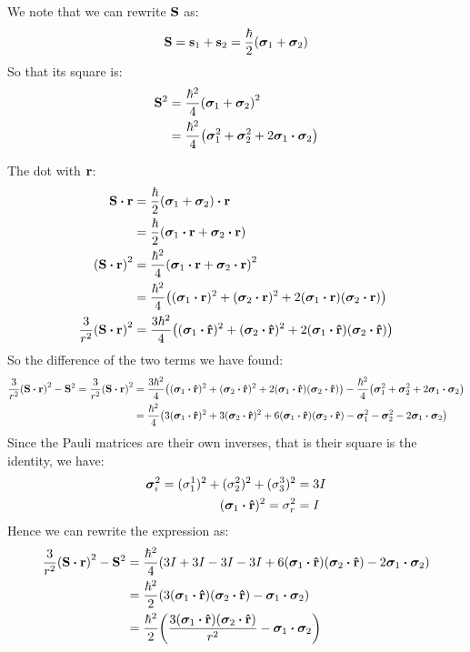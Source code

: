 \documentclass[12pt]{article}
\begin{document}
We note that we can rewrite $\vb{S}$ as:
\begin{align*}
  \vb{S}=\vb{s}_1+\vb{s}_2=\frac{\hbar}{2}\qty(\bm\sigma_1+\bm\sigma_2)
\end{align*}
So that its square is:
\begin{align*}
  \vb{S}^2&=\frac{\hbar^2}{4}\qty(\bm\sigma_1+\bm\sigma_2)^2\\
  &=\frac{\hbar^2}{4}
  \qty(\bm\sigma_1^2+\bm\sigma_2^2+2\bm\sigma_1\vdot\bm\sigma_2)
\end{align*}

The dot with $\vb{r}$:
\begin{align*}
  \vb{S}\vdot\vb{r}&=\frac{\hbar}{2}\qty(\bm\sigma_1+\bm\sigma_2)\vdot\vb{r}\\
  &=\frac{\hbar}{2}\qty(\bm\sigma_1\vdot\vb{r}+\bm\sigma_2\vdot\vb{r})\\
  \qty(\vb{S}\vdot\vb{r})^2&=
  \frac{\hbar^2}{4}\qty(\bm\sigma_1\vdot\vb{r}+\bm\sigma_2\vdot\vb{r})^2\\
  &=\frac{\hbar^2}{4}\qty(
  (\bm\sigma_1\vdot\vb{r})^2+(\bm\sigma_2\vdot\vb{r})^2
  +2(\bm\sigma_1\vdot\vb{r})(\bm\sigma_2\vdot\vb{r}))\\
  \frac{3}{r^2}\qty(\vb{S}\vdot\vb{r})^2&=\frac{3\hbar^2}{4}\qty(
  (\bm\sigma_1\vdot\vu{r})^2+(\bm\sigma_2\vdot\vu{r})^2
  +2(\bm\sigma_1\vdot\vu{r})(\bm\sigma_2\vdot\vu{r}))
\end{align*}
So the difference of the two terms we have found:
\begin{align*}
  \frac{3}{r^2}\qty(\vb{S}\vdot\vb{r})^2-\vb{S}^2=
  \frac{3}{r^2}\qty(\vb{S}\vdot\vb{r})^2&=
  \frac{3\hbar^2}{4}\qty(
  (\bm\sigma_1\vdot\vu{r})^2+(\bm\sigma_2\vdot\vu{r})^2
  +2(\bm\sigma_1\vdot\vu{r})(\bm\sigma_2\vdot\vu{r}))
  -\frac{\hbar^2}{4}
  \qty(\bm\sigma_1^2+\bm\sigma_2^2+2\bm\sigma_1\vdot\bm\sigma_2)\\
  &=\frac{\hbar^2}{4}\qty(
  3(\bm\sigma_1\vdot\vu{r})^2+3(\bm\sigma_2\vdot\vu{r})^2
  +6(\bm\sigma_1\vdot\vu{r})(\bm\sigma_2\vdot\vu{r})-
  \bm\sigma_1^2-\bm\sigma_2^2-2\bm\sigma_1\vdot\bm\sigma_2)
\end{align*}
Since the Pauli matrices are their own inverses, that is their square is the identity, we have:
\begin{align*}
  \bm\sigma_{i}^2=(\sigma_1^1)^2+(\sigma_2^2)^2+(\sigma_3^3)^2&=3I\\
  (\bm\sigma_1\vdot\vu{r})^2=\sigma_{r}^2&=I
\end{align*}
Hence we can rewrite the expression as:
\begin{align*}
  \frac{3}{r^2}\qty(\vb{S}\vdot\vb{r})^2-\vb{S}^2&=
  \frac{\hbar^2}{4}\qty(3I+3I-3I-3I
  +6(\bm\sigma_1\vdot\vu{r})(\bm\sigma_2\vdot\vu{r})
  -2\bm\sigma_1\vdot\bm\sigma_2)\\
  &=\frac{\hbar^2}{2}\qty(
  3(\bm\sigma_1\vdot\vu{r})(\bm\sigma_2\vdot\vu{r})
  -\bm\sigma_1\vdot\bm\sigma_2)\\
  &=\frac{\hbar^2}2\qty(
  \frac{3(\bm\sigma_1\vdot\vu{r})(\bm\sigma_2\vdot\vu{r})}{r^2}
  -\bm\sigma_1\vdot\bm\sigma_2)
\end{align*}
\end{document}
